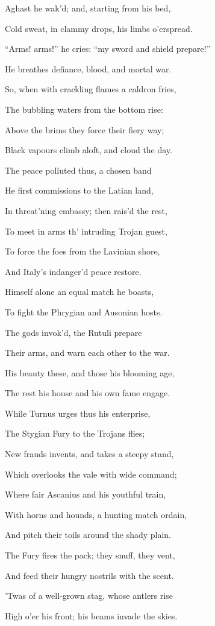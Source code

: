 Aghast he wak’d; and, starting from his bed,

Cold sweat, in clammy drops, his limbs o’erspread.

“Arms! arms!” he cries: “my sword and shield prepare!”

He breathes defiance, blood, and mortal war.

So, when with crackling flames a caldron fries,

The bubbling waters from the bottom rise:

Above the brims they force their fiery way;

Black vapours climb aloft, and cloud the day.

The peace polluted thus, a chosen band

He first commissions to the Latian land,

In threat’ning embassy; then rais’d the rest,

To meet in arms th’ intruding Trojan guest,

To force the foes from the Lavinian shore,

And Italy’s indanger’d peace restore.

Himself alone an equal match he boasts,

To fight the Phrygian and Ausonian hosts.

The gods invok’d, the Rutuli prepare

Their arms, and warn each other to the war.

His beauty these, and those his blooming age,

The rest his house and his own fame engage.

While Turnus urges thus his enterprise,

The Stygian Fury to the Trojans flies;

New frauds invents, and takes a steepy stand,

Which overlooks the vale with wide command;

Where fair Ascanius and his youthful train,

With horns and hounds, a hunting match ordain,

And pitch their toils around the shady plain.

The Fury fires the pack; they snuff, they vent,

And feed their hungry nostrils with the scent.

’Twas of a well-grown stag, whose antlers rise

High o’er his front; his beams invade the skies.

